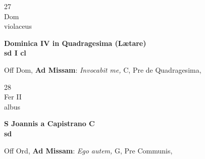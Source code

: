 \documentclass[10pt, openany]{book}
\begin{document}
        \begin{center}
            \begin{minipage}{3.5in}
                \vspace{2em}
                \begin{minipage}{0.5in}
                    {\Huge 27} \\
                    {\normalsize Dom} \\
                    {\normalsize violaceus}
                \end{minipage}
                \begin{minipage}{3.0in}
                    \textbf{ \large Dominica IV in Quadragesima (Lætare) \\
                    \textnormal{\normalsize sd I cl}} \\ 
                \end{minipage}
                \begin{justify}Off Dom, \textbf{Ad Missam}: \textit{Invocabit me,} C, Pre de Quadragesima,  
                \end{justify}
            \end{minipage}
        \end{center}
    
        \begin{center}
            \begin{minipage}{3.5in}
                \vspace{2em}
                \begin{minipage}{0.5in}
                    {\Huge 28} \\
                    {\normalsize Fer II} \\
                    {\normalsize albus}
                \end{minipage}
                \begin{minipage}{3.0in}
                    \textbf{ \large S Joannis a Capistrano C \\
                    \textnormal{\normalsize sd}} \\ 
                \end{minipage}
                \begin{justify}Off Ord, \textbf{Ad Missam}: \textit{Ego autem,} G, Pre Communis,  
                \end{justify}
            \end{minipage}
        \end{center}
    
\end{document}

